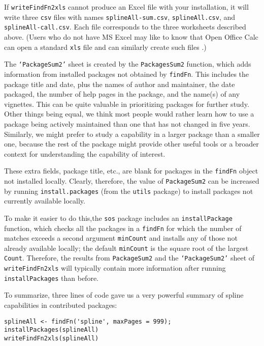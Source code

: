 If {\tt writeFindFn2xls} cannot produce an Excel file with 
your installation, it will write three {\tt csv} files with
names {\tt splineAll-sum.csv}, {\tt splineAll.csv}, and
{\tt splineAll-call.csv}.  Each file corresponds to the three
worksheets described above. (Users who do not have MS Excel
may like to know that Open Office Calc can open a standard
{\tt xls} file and can similarly create such files
\citep{CALC09MAN}.)

The {\tt `PackageSum2'} sheet is created by the
{\tt PackagesSum2} function, which adds information from
installed packages not obtained by
{\tt findFn}.  This includes the package title and date, plus
the names of author and maintainer,
the date packaged, the number of help pages in the package,
and the name(s) of any vignettes.  This can be quite
valuable in prioritizing packages for further study.  
Other things being equal, we think most people would 
rather learn how to use a package being actively maintained
than one that has not changed in five years.  Similarly,
we might prefer to study a capability in a larger package
than a smaller one, because the rest of the package might
provide other useful tools or a broader context for
understanding the capability of interest.

These extra fields, package title, etc., are blank for 
packages in the {\tt findFn} object not installed locally.  
Clearly, therefore, the value of {\tt PackageSum2} can be 
increased by running {\tt install.packages} (from the 
{\tt utils} package) to install packages not currently 
available locally.

To make it easier to do this,the {\tt sos} package includes 
an {\tt installPackage} function, which checks all the 
packages in a {\tt findFn} for which
the number of matches exceeds a second argument {\tt minCount}
and installs any of those not already available locally;  the
default {\tt minCount} is the square root of the largest
{\tt Count}.  Therefore, the results from {\tt PackageSum2} and the
{\tt `PackageSum2'} sheet of {\tt writeFindFn2xls} will typically
contain more information after running {\tt installPackages}
than before.

To summarize, three lines of code gave us a very powerful
summary of spline capabilities in contributed \R{}
packages:

\begin{verbatim}
splineAll <- findFn('spline', maxPages = 999);
installPackages(splineAll) 
writeFindFn2xls(splineAll)
\end{verbatim}

